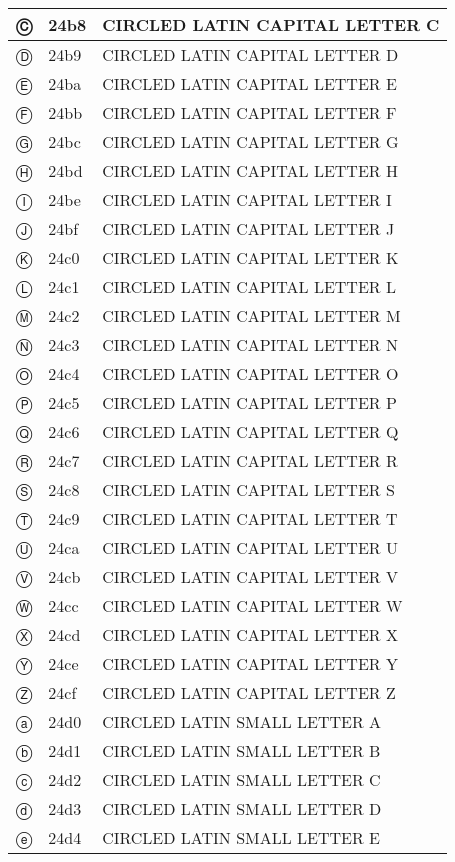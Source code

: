 \documentclass[12pt,letterpaper,openany]{book}
\begin{document}
\begin{center}
\begin{supertabular}{|m{0.25in}|m{0.5in}|m{4in}|}
Ⓒ & 24b8 & CIRCLED LATIN CAPITAL LETTER C\\\hline
Ⓓ & 24b9 & CIRCLED LATIN CAPITAL LETTER D\\\hline
Ⓔ & 24ba & CIRCLED LATIN CAPITAL LETTER E\\\hline
Ⓕ & 24bb & CIRCLED LATIN CAPITAL LETTER F\\\hline
Ⓖ & 24bc & CIRCLED LATIN CAPITAL LETTER G\\\hline
Ⓗ & 24bd & CIRCLED LATIN CAPITAL LETTER H\\\hline
Ⓘ & 24be & CIRCLED LATIN CAPITAL LETTER I\\\hline
Ⓙ & 24bf & CIRCLED LATIN CAPITAL LETTER J\\\hline
Ⓚ & 24c0 & CIRCLED LATIN CAPITAL LETTER K\\\hline
Ⓛ & 24c1 & CIRCLED LATIN CAPITAL LETTER L\\\hline
Ⓜ & 24c2 & CIRCLED LATIN CAPITAL LETTER M\\\hline
Ⓝ & 24c3 & CIRCLED LATIN CAPITAL LETTER N\\\hline
Ⓞ & 24c4 & CIRCLED LATIN CAPITAL LETTER O\\\hline
Ⓟ & 24c5 & CIRCLED LATIN CAPITAL LETTER P\\\hline
Ⓠ & 24c6 & CIRCLED LATIN CAPITAL LETTER Q\\\hline
Ⓡ & 24c7 & CIRCLED LATIN CAPITAL LETTER R\\\hline
Ⓢ & 24c8 & CIRCLED LATIN CAPITAL LETTER S\\\hline
Ⓣ & 24c9 & CIRCLED LATIN CAPITAL LETTER T\\\hline
Ⓤ & 24ca & CIRCLED LATIN CAPITAL LETTER U\\\hline
Ⓥ & 24cb & CIRCLED LATIN CAPITAL LETTER V\\\hline
Ⓦ & 24cc & CIRCLED LATIN CAPITAL LETTER W\\\hline
Ⓧ & 24cd & CIRCLED LATIN CAPITAL LETTER X\\\hline
Ⓨ & 24ce & CIRCLED LATIN CAPITAL LETTER Y\\\hline
Ⓩ & 24cf & CIRCLED LATIN CAPITAL LETTER Z\\\hline
ⓐ & 24d0 & CIRCLED LATIN SMALL LETTER A\\\hline
ⓑ & 24d1 & CIRCLED LATIN SMALL LETTER B\\\hline
ⓒ & 24d2 & CIRCLED LATIN SMALL LETTER C\\\hline
ⓓ & 24d3 & CIRCLED LATIN SMALL LETTER D\\\hline
ⓔ & 24d4 & CIRCLED LATIN SMALL LETTER E\\\hline

\end{supertabular}
\end{center}
\end{document}
